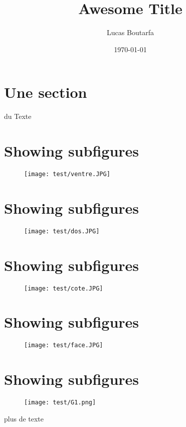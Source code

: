 \documentclass{article}%
\title{Awesome Title}%
\author{Lucas Boutarfa}%
\date{\today}%
\begin{document}
%
\normalsize%
\maketitle%
\section{Une section}%
du Texte%
\section{Showing subfigures}%


\begin{figure}%
\centering%
\texttt{[image: test/ventre.JPG]}%
\end{figure}

%
\section{Showing subfigures}%


\begin{figure}%
\centering%
\texttt{[image: test/dos.JPG]}%
\end{figure}

%
\section{Showing subfigures}%


\begin{figure}%
\centering%
\texttt{[image: test/cote.JPG]}%
\end{figure}

%
\section{Showing subfigures}%


\begin{figure}%
\centering%
\texttt{[image: test/face.JPG]}%
\end{figure}

%
\section{Showing subfigures}%


\begin{figure}%
\centering%
\texttt{[image: test/G1.png]}%
\end{figure}

%
plus de texte%
\end{document}
